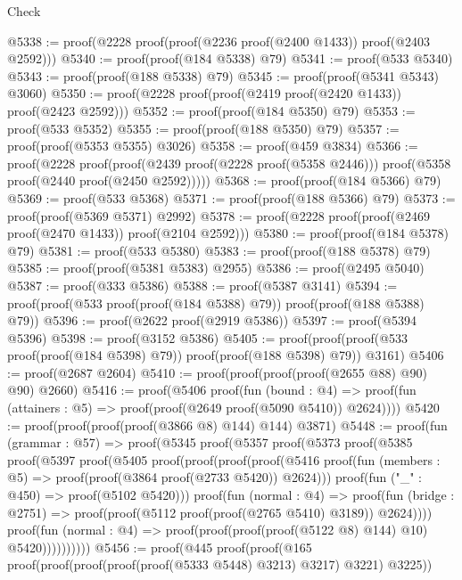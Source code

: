 \begin{lexlean}{Check}
\begin{coremodule}
@5338 := proof(@2228 proof(proof(@2236 proof(@2400 @1433)) proof(@2403 @2592)))
@5340 := proof(proof(@184 @5338) @79)
@5341 := proof(@533 @5340)
@5343 := proof(proof(@188 @5338) @79)
@5345 := proof(proof(@5341 @5343) @3060)
@5350 := proof(@2228 proof(proof(@2419 proof(@2420 @1433)) proof(@2423 @2592)))
@5352 := proof(proof(@184 @5350) @79)
@5353 := proof(@533 @5352)
@5355 := proof(proof(@188 @5350) @79)
@5357 := proof(proof(@5353 @5355) @3026)
@5358 := proof(@459 @3834)
@5366 := proof(@2228
      proof(proof(@2439 proof(@2228 proof(@5358 @2446)))
          proof(@5358 proof(@2440 proof(@2450 @2592)))))
@5368 := proof(proof(@184 @5366) @79)
@5369 := proof(@533 @5368)
@5371 := proof(proof(@188 @5366) @79)
@5373 := proof(proof(@5369 @5371) @2992)
@5378 := proof(@2228 proof(proof(@2469 proof(@2470 @1433)) proof(@2104 @2592)))
@5380 := proof(proof(@184 @5378) @79)
@5381 := proof(@533 @5380)
@5383 := proof(proof(@188 @5378) @79)
@5385 := proof(proof(@5381 @5383) @2955)
@5386 := proof(@2495 @5040)
@5387 := proof(@333 @5386)
@5388 := proof(@5387 @3141)
@5394 := proof(proof(@533 proof(proof(@184 @5388) @79)) proof(proof(@188 @5388) @79))
@5396 := proof(@2622 proof(@2919 @5386))
@5397 := proof(@5394 @5396)
@5398 := proof(@3152 @5386)
@5405 := proof(proof(proof(@533 proof(proof(@184 @5398) @79)) proof(proof(@188 @5398) @79)) @3161)
@5406 := proof(@2687 @2604)
@5410 := proof(proof(proof(proof(@2655 @88) @90) @90) @2660)
@5416 := proof(@5406
      proof(fun (bound : @4) =>
        proof(fun (attainers : @5) => proof(proof(@2649 proof(@5090 @5410)) @2624))))
@5420 := proof(proof(proof(proof(@3866 @8) @144) @144) @3871)
@5448 := proof(fun (grammar : @57) =>
    proof(@5345
        proof(@5357
            proof(@5373
                proof(@5385
                    proof(@5397
                        proof(@5405
                            proof(proof(proof(proof(@5416
                                      proof(fun (members : @5) =>
                                        proof(proof(@3864 proof(@2733 @5420)) @2624)))
                                    proof(fun ("_" : @450) => proof(@5102 @5420)))
                                  proof(fun (normal : @4) =>
                                    proof(fun (bridge : @2751) =>
                                      proof(proof(@5112 proof(proof(@2765 @5410) @3189)) @2624))))
                                proof(fun (normal : @4) =>
                                  proof(proof(proof(proof(@5122 @8) @144) @10) @5420))))))))))
@5456 := proof(@445
      proof(proof(@165 proof(proof(proof(proof(proof(@5333 @5448) @3213) @3217) @3221) @3225))

\end{coremodule}
\end{lexlean}
